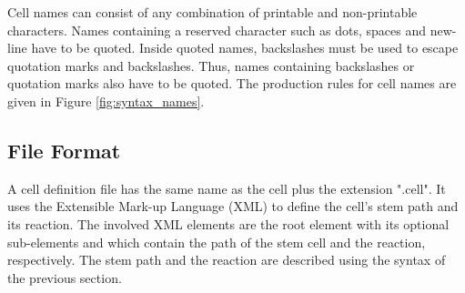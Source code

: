 
Cell names can consist of any combination of printable and non-printable characters. Names containing a reserved character such as dots, spaces and new-line have to be quoted. Inside quoted names, backslashes must be used to escape quotation marks and backslashes. Thus, names containing backslashes or quotation marks also have to be quoted. The production rules for cell names are given in Figure \ref{fig:syntax_names}.


\subsection{File Format}

A cell definition file has the same name as the cell plus the extension ".cell". It uses the Extensible Mark-up Language (XML)  to define the cell's stem path and its reaction. The involved XML elements are the root element  with its optional sub-elements  and  which contain the path of the stem cell and the reaction, respectively. The stem path and the reaction are described using the syntax of the previous section.

